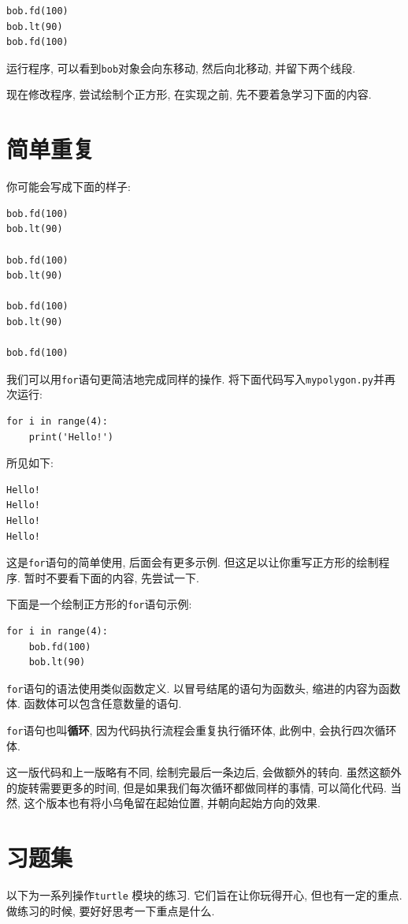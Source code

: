 \documentclass[10pt]{book}
\begin{document}
\begin{verbatim}
bob.fd(100)
bob.lt(90)
bob.fd(100)
\end{verbatim}
%
运行程序, 可以看到{\tt bob}对象会向东移动, 然后向北移动, 并留下两个线段. 

现在修改程序, 尝试绘制个正方形, 在实现之前, 先不要着急学习下面的内容. 


\section{简单重复}
\label{repetition}

你可能会写成下面的样子:

\begin{verbatim}
bob.fd(100)
bob.lt(90)

bob.fd(100)
bob.lt(90)

bob.fd(100)
bob.lt(90)

bob.fd(100)
\end{verbatim}
%
我们可以用{\tt for}语句更简洁地完成同样的操作. 
将下面代码写入{\tt mypolygon.py}并再次运行:

\begin{verbatim}
for i in range(4):
    print('Hello!')
\end{verbatim}
%
所见如下:

\begin{verbatim}
Hello!
Hello!
Hello!
Hello!
\end{verbatim}
%
这是{\tt for}语句的简单使用, 后面会有更多示例. 
但这足以让你重写正方形的绘制程序. 
暂时不要看下面的内容, 先尝试一下. 

下面是一个绘制正方形的{\tt for}语句示例:

\begin{verbatim}
for i in range(4):
    bob.fd(100)
    bob.lt(90)
\end{verbatim}
%
{\tt for}语句的语法使用类似函数定义. 
以冒号结尾的语句为函数头, 
缩进的内容为函数体. 
函数体可以包含任意数量的语句. 

{\tt for}语句也叫{\bf 循环}, 因为代码执行流程会重复执行循环体, 
此例中, 会执行四次循环体.

这一版代码和上一版略有不同, 绘制完最后一条边后, 会做额外的转向. 
虽然这额外的旋转需要更多的时间, 但是如果我们每次循环都做同样的事情, 
可以简化代码. 
当然, 这个版本也有将小乌龟留在起始位置, 并朝向起始方向的效果. 

\section{习题集}
以下为一系列操作{\tt turtle} 模块的练习. 
它们旨在让你玩得开心, 但也有一定的重点. 
做练习的时候, 要好好思考一下重点是什么. 
\end{document}
